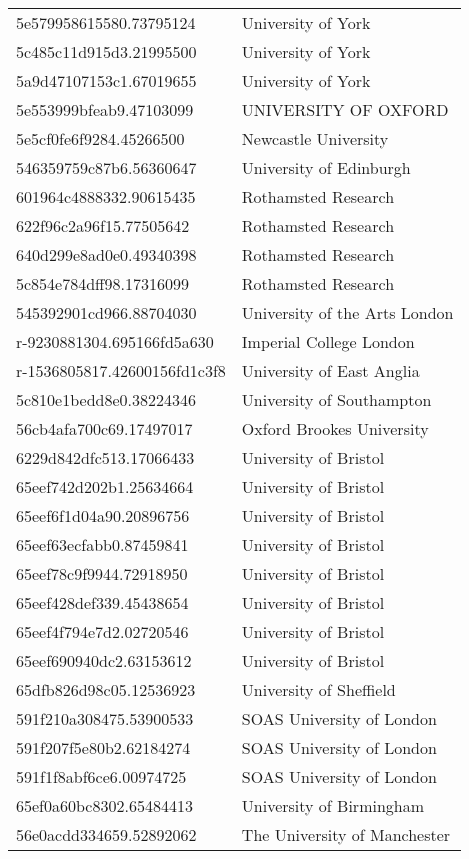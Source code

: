 \begin{tabular}{ll}
5e579958615580.73795124 & University of York \\
5c485c11d915d3.21995500 & University of York \\
5a9d47107153c1.67019655 & University of York \\
5e553999bfeab9.47103099 & UNIVERSITY OF OXFORD \\
5e5cf0fe6f9284.45266500 & Newcastle University \\
546359759c87b6.56360647 & University of Edinburgh \\
601964c4888332.90615435 & Rothamsted Research \\
622f96c2a96f15.77505642 & Rothamsted Research \\
640d299e8ad0e0.49340398 & Rothamsted Research \\
5c854e784dff98.17316099 & Rothamsted Research \\
545392901cd966.88704030 & University of the Arts London \\
r-9230881304.695166fd5a630 & Imperial College London \\
r-1536805817.42600156fd1c3f8 & University of East Anglia \\
5c810e1bedd8e0.38224346 & University of Southampton \\
56cb4afa700c69.17497017 & Oxford Brookes University \\
6229d842dfc513.17066433 & University of Bristol \\
65eef742d202b1.25634664 & University of Bristol \\
65eef6f1d04a90.20896756 & University of Bristol \\
65eef63ecfabb0.87459841 & University of Bristol \\
65eef78c9f9944.72918950 & University of Bristol \\
65eef428def339.45438654 & University of Bristol \\
65eef4f794e7d2.02720546 & University of Bristol \\
65eef690940dc2.63153612 & University of Bristol \\
65dfb826d98c05.12536923 & University of Sheffield \\
591f210a308475.53900533 & SOAS University of London \\
591f207f5e80b2.62184274 & SOAS University of London \\
591f1f8abf6ce6.00974725 & SOAS University of London \\
65ef0a60bc8302.65484413 & University of Birmingham \\
56e0acdd334659.52892062 & The University of Manchester \\

\end{tabular}
